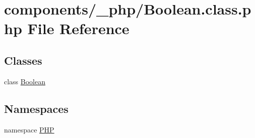 \hypertarget{_boolean_8class_8php}{
\section{components/\_\-php/Boolean.class.php File Reference}
\label{_boolean_8class_8php}
}
\subsection*{Classes}
\begin{CompactItemize}
\item 
class \hyperlink{class_boolean}{Boolean}
\end{CompactItemize}
\subsection*{Namespaces}
\begin{CompactItemize}
\item 
namespace \hyperlink{namespace_p_h_p}{PHP}
\end{CompactItemize}
